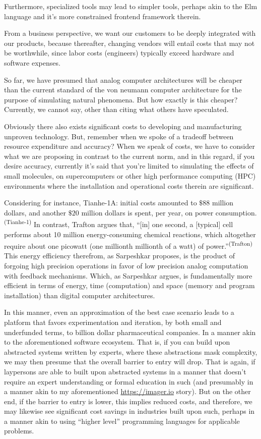 Furthermore, specialized tools may lead to simpler tools, perhaps akin to the Elm language and it's more constrained frontend framework therein.


From a business perspective, we want our customers to be deeply integrated with our products, because thereafter, changing vendors will entail costs that may not be worthwhile, since labor costs (engineers) typically exceed hardware and software expenses.

So far, we have presumed that analog computer architectures will be cheaper than the current standard of the von neumann computer architecture for the purpose of simulating natural phenomena. But how exactly is this cheaper? Currently, we cannot say, other than citing what others have speculated.


Obviously there also exists significant costs to developing and manufacturing unproven technology. But, remember when we spoke of a tradeoff between resource expenditure and accuracy? When we speak of costs, we have to consider what we are proposing in contrast to the current norm, and in this regard, if you desire accuracy, currently it's said that you're limited to simulating the effects of small molecules, on supercomputers or other high performance computing (HPC) environments where the installation and operational costs therein are significant.

Considering for instance, Tianhe-1A: initial costs amounted to $\$88$ million dollars, and another $\$20$ million dollars is spent, per year, on power consumption.\textsuperscript{(Tianhe-1)} In contrast, Trafton argues that, ``[in] one second, a [typical] cell performs about 10 million energy-consuming chemical reactions, which altogether require about one picowatt (one millionth millionth of a watt) of power.''\textsuperscript{(Trafton)} This energy efficiency therefrom, as Sarpeshkar proposes, is the product of forgoing high precision operations in favor of low precision analog computation with feedback mechanisms. Which, as Sarpeshkar argues, is fundamentally more efficient in terms of energy, time (computation) and space (memory and program installation) than digital computer architectures.

In this manner, even an approximation of the best case scenario leads to a platform that favors experimentation and iteration, by both small and underfunded terms, to billion dollar pharmaceutical companies. In a manner akin to the aforementioned software ecosystem. That is, if you can build upon abstracted systems written by experts, where these abstractions mask complexity, we may then presume that the overall barrier to entry will drop. That is again, if laypersons are able to built upon abstracted systems in a manner that doesn't require an expert understanding or formal education in such (and presumably in a manner akin to my aforementioned \url{https://imager.io} story). But on the other end, if the barrier to entry is lower, this implies reduced costs, and therefore, we may likewise see significant cost savings in industries built upon such, perhaps in a manner akin to using ``higher level'' programming languages for applicable problems. 

